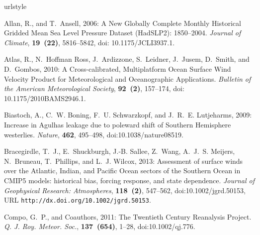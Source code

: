 \documentclass{ametsoc}
\begin{document}
\begin{thebibliography}{53}
\providecommand{\natexlab}[1]{#1}
\providecommand{\url}[1]{\texttt{#1}}
\renewcommand{\UrlFont}{\rmfamily}
\providecommand{\urlprefix}{URL }
\expandafter\ifx\csname urlstyle\endcsname\relax
  \providecommand{\doi}[1]{doi:\discretionary{}{}{}#1}\else
  \providecommand{\doi}{doi:\discretionary{}{}{}\begingroup
  \urlstyle{rm}\Url}\fi
\providecommand{\eprint}[2][]{\url{#2}}

Allan, R., and T.~Ansell, 2006: {A New Globally Complete Monthly Historical
  Gridded Mean Sea Level Pressure Dataset (HadSLP2): 1850--2004}.
  \textit{Journal of Climate}, \textbf{19~(22)}, 5816--5842, doi:
  10.1175/JCLI3937.1.

Atlas, R., N.~{Hoffman Ross}, J.~Ardizzone, S.~Leidner, J.~Jusem, D.~Smith, and
  D.~Gombos, 2010: {A Cross-calibrated, Multiplatform Ocean Surface Wind
  Velocity Product for Meteorological and Oceanographic Applications}.
  \textit{Bulletin of the American Meteorological Society}, \textbf{92~(2)},
  157--174, doi: 10.1175/2010BAMS2946.1.

Biastoch, A., C.~W. Boning, F.~U. Schwarzkopf, and J.~R.~E. Lutjeharms, 2009:
  {Increase in {A}gulhas leakage due to poleward shift of {S}outhern
  {H}emisphere westerlies}. \textit{Nature}, \textbf{462}, 495--498,
  \doi{10.1038/nature08519}.

Bracegirdle, T.~J., E.~Shuckburgh, J.-B. Sallee, Z.~Wang, A.~J.~S. Meijers,
  N.~Bruneau, T.~Phillips, and L.~J. Wilcox, 2013: {Assessment of surface winds
  over the Atlantic, Indian, and Pacific Ocean sectors of the Southern Ocean in
  CMIP5 models: historical bias, forcing response, and state dependence}.
  \textit{Journal of Geophysical Research: Atmospheres}, \textbf{118~(2)},
  547--562, \doi{10.1002/jgrd.50153},
  \urlprefix\url{http://dx.doi.org/10.1002/jgrd.50153}.

Compo, G.~P., and Coauthors, 2011: {The {T}wentieth {C}entury Reanalysis
  Project}. \textit{Q. J. Roy. Meteor. Soc.}, \textbf{137~(654)}, 1--28,
  \doi{10.1002/qj.776}.


\end{thebibliography}
\end{document}

